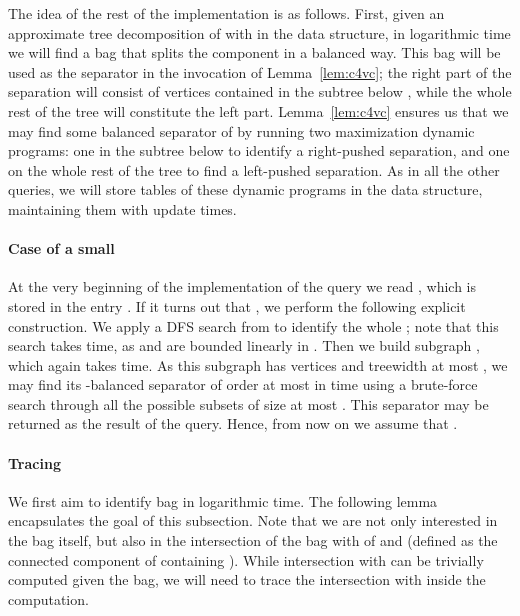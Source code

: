 \documentclass[a4paper,11pt]{article}
\theoremstyle{definition}
\theoremstyle{remark}
\begin{document}
The idea of the rest of the implementation is as follows.  First,
given an approximate tree decomposition of with  in the data
structure, in logarithmic time we will find a bag  that
splits the component  in a balanced way.  This bag will be used as
the separator  in the invocation of Lemma~\ref{lem:c4vc}; the right
part of the separation will consist of vertices contained in the
subtree below , while the whole rest of the tree will
constitute the left part.  Lemma~\ref{lem:c4vc} ensures us that we may
find some balanced separator of  by running two maximization
dynamic programs: one in the subtree below  to identify a
right-pushed separation, and one on the whole rest of the tree to find
a left-pushed separation.  As in all the other queries, we will store
tables of these dynamic programs in the data structure, maintaining them
with  update times.

\paragraph{Case of a small }
At the very beginning of the implementation of the query we read
, which is stored in the entry .
If it turns out that , we perform the following
explicit construction.  We apply a DFS search from  to identify
the whole ; note that this search takes  time, as  and
 are bounded linearly in .  Then we build subgraph , which
again takes  time.  As this subgraph has  vertices and
treewidth at most , we may find its -balanced
separator of order at most  in  time using a brute-force
search through all the possible subsets of size at most .  This
separator may be returned as the result of the query.  Hence, from now
on we assume that .

\paragraph{Tracing }
We first aim to identify bag  in logarithmic time.  The
following lemma encapsulates the goal of this subsection.  Note that
we are not only interested in the bag itself, but also in the
intersection of the bag with of  and  (defined as the connected
component of  containing ).  While intersection
with  can be trivially computed given the bag, we will need to
trace the intersection with  inside the computation.
\end{document}
